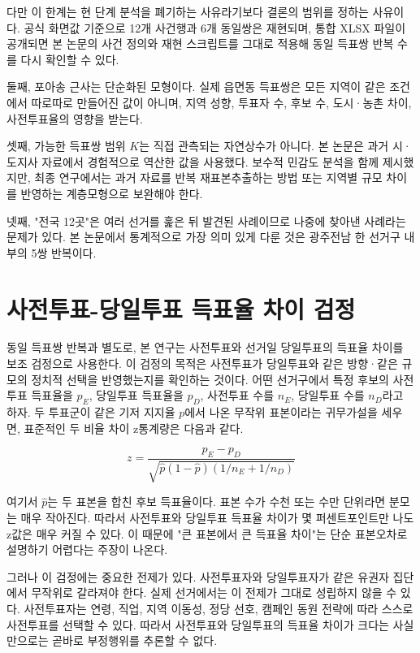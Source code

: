 \documentclass[preprint]{IEIE}
\begin{document}
다만 이 한계는 현 단계 분석을 폐기하는 사유라기보다 결론의 범위를 정하는 사유이다. 공식 화면값 기준으로 12개 사건행과 6개 동일쌍은 재현되며, 통합 XLSX 파일이 공개되면 본 논문의 사건 정의와 재현 스크립트를 그대로 적용해 동일 득표쌍 반복 수를 다시 확인할 수 있다.

둘째, 포아송 근사는 단순화된 모형이다. 실제 읍면동 득표쌍은 모든 지역이 같은 조건에서 따로따로 만들어진 값이 아니며, 지역 성향, 투표자 수, 후보 수, 도시·농촌 차이, 사전투표율의 영향을 받는다.

셋째, 가능한 득표쌍 범위 \(K\)는 직접 관측되는 자연상수가 아니다. 본 논문은 과거 시·도지사 자료에서 경험적으로 역산한 값을 사용했다. 보수적 민감도 분석을 함께 제시했지만, 최종 연구에서는 과거 자료를 반복 재표본추출하는 방법 또는 지역별 규모 차이를 반영하는 계층모형으로 보완해야 한다.

넷째, "전국 12곳"은 여러 선거를 훑은 뒤 발견된 사례이므로 나중에 찾아낸 사례라는 문제가 있다. 본 논문에서 통계적으로 가장 의미 있게 다룬 것은 광주전남 한 선거구 내부의 5쌍 반복이다.

\section{사전투표-당일투표 득표율 차이 검정}

동일 득표쌍 반복과 별도로, 본 연구는 사전투표와 선거일 당일투표의 득표율 차이를 보조 검정으로 사용한다. 이 검정의 목적은 사전투표가 당일투표와 같은 방향·같은 규모의 정치적 선택을 반영했는지를 확인하는 것이다. 어떤 선거구에서 특정 후보의 사전투표 득표율을 \(p_E\), 당일투표 득표율을 \(p_D\), 사전투표 수를 \(n_E\), 당일투표 수를 \(n_D\)라고 하자. 두 투표군이 같은 기저 지지율 \(p\)에서 나온 무작위 표본이라는 귀무가설을 세우면, 표준적인 두 비율 차이 z통계량은 다음과 같다.

\[
z = \frac{p_E - p_D}{\sqrt{\hat{p}(1-\hat{p})(1/n_E + 1/n_D)}}
\]

여기서 \(\hat{p}\)는 두 표본을 합친 후보 득표율이다. 표본 수가 수천 또는 수만 단위라면 분모는 매우 작아진다. 따라서 사전투표와 당일투표 득표율 차이가 몇 퍼센트포인트만 나도 z값은 매우 커질 수 있다. 이 때문에 "큰 표본에서 큰 득표율 차이"는 단순 표본오차로 설명하기 어렵다는 주장이 나온다.

그러나 이 검정에는 중요한 전제가 있다. 사전투표자와 당일투표자가 같은 유권자 집단에서 무작위로 갈라져야 한다. 실제 선거에서는 이 전제가 그대로 성립하지 않을 수 있다. 사전투표자는 연령, 직업, 지역 이동성, 정당 선호, 캠페인 동원 전략에 따라 스스로 사전투표를 선택할 수 있다. 따라서 사전투표와 당일투표의 득표율 차이가 크다는 사실만으로는 곧바로 부정행위를 추론할 수 없다.
\end{document}
